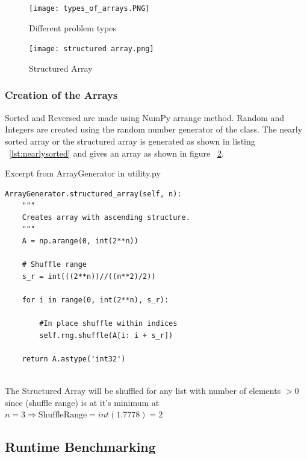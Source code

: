 \documentclass[sigconf, nonacm, natbib, screen, balance=False]{acmart}
\begin{document}
\begin{figure}
  \centering
  \texttt{[image: types\_of\_arrays.PNG]}
  \caption{Different problem types}
  \label{fig:arrays}
\end{figure}

\begin{figure}
  \centering
  \texttt{[image: structured array.png]}
  \caption{Structured Array}
  \label{fig:structarr}
\end{figure}

\subsubsection{Creation of the Arrays}\label{sec:createarrays}

Sorted and Reversed are made using NumPy arrange method. Random and Integers are created using the random number generator of the class. The nearly sorted array or the structured array is generated as shown in listing ~\ref{lst:nearlysorted} and gives an array as shown in figure ~\ref{fig:structarr}.


\begin{listing}[h]
  \caption{Excerpt from ArrayGenerator in utility.py}
  \label{lst:nearlysorted}
  \begin{lstlisting}
ArrayGenerator.structured_array(self, n):
    """
    Creates array with ascending structure.
    """
    A = np.arange(0, int(2**n))
    
    # Shuffle range
    s_r = int(((2**n))//((n**2)/2))
    
    for i in range(0, int(2**n), s_r):

        #In place shuffle within indices
        self.rng.shuffle(A[i: i + s_r])

    return A.astype('int32')
   
  \end{lstlisting}
\end{listing}

The Structured Array will be shuffled for any list with number of elements $> 0$ since (shuffle range) is at it's minimum at $n = 3 \Rightarrow \text{ShuffleRange} = int(1.7778) = 2$

\subsection{Runtime Benchmarking}\label{sec:methbench}
\end{document}

